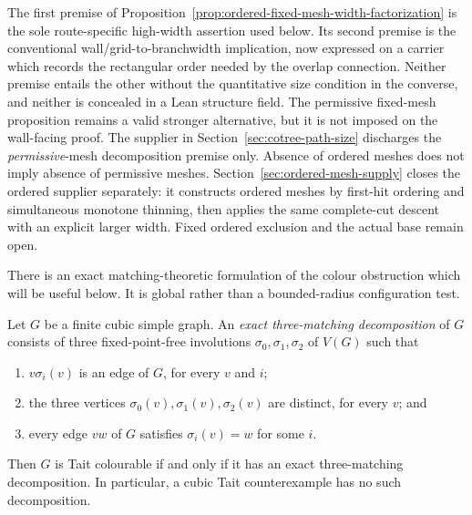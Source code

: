 The first premise of
Proposition~\ref{prop:ordered-fixed-mesh-width-factorization} is the sole
route-specific high-width assertion used below.  Its second premise is the
conventional wall/grid-to-branchwidth implication, now expressed on a
carrier which records the rectangular order needed by the overlap
connection.  Neither premise entails the other without the quantitative
size condition in the converse, and neither is concealed in a Lean
structure field.  The permissive fixed-mesh proposition remains a valid
stronger alternative, but it is not imposed on the wall-facing proof.
The supplier in Section~\ref{sec:cotree-path-size} discharges the
\emph{permissive}-mesh decomposition premise only.  Absence of ordered
meshes does not imply absence of permissive meshes.  Section~\ref{sec:ordered-mesh-supply}
closes the ordered supplier separately: it constructs ordered meshes by
first-hit ordering and simultaneous monotone thinning, then applies the
same complete-cut descent with an explicit larger width.  Fixed ordered
exclusion and the actual base remain open.

There is an exact matching-theoretic formulation of the colour obstruction
which will be useful below.  It is global rather than a bounded-radius
configuration test.

\begin{theorem}
\label{thm:tait-three-matching-decomposition}
Let \(G\) be a finite cubic simple graph.  An \emph{exact three-matching
decomposition} of \(G\) consists of three fixed-point-free involutions
\(\sigma_0,\sigma_1,\sigma_2\) of \(V(G)\) such that
\begin{enumerate}
\item \(v\sigma_i(v)\) is an edge of \(G\), for every \(v\) and \(i\);
\item the three vertices \(\sigma_0(v),\sigma_1(v),\sigma_2(v)\) are distinct,
      for every \(v\); and
\item every edge \(v w\) of \(G\) satisfies \(\sigma_i(v)=w\) for some \(i\).
\end{enumerate}
Then \(G\) is Tait colourable if and only if it has an exact three-matching
decomposition.  In particular, a cubic Tait counterexample has no such
decomposition.
\end{theorem}

